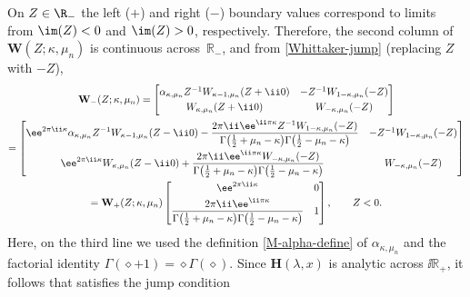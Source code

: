 On $Z\in\R_-$ the left ($+$) and right ($-$) boundary values correspond to limits from ${\im(Z)<0}$ and $\im(Z)>0$, respectively. Therefore, the second column of $\mathbf{W}(Z;\kappa,\mu_n)$ is continuous across~$\mathbb{R}_-$, and from \eqref{Whittaker-jump} (replacing $Z$ with $-Z$),
\begin{gather*}%
 \mathbf{W}_{-}(Z;\kappa,\mu_n)
 =
 \begin{bmatrix}
 \alpha_{\kappa,\mu_n}Z^{-1}W_{\kappa-1,\mu_n}(Z+\ii 0) & -Z^{-1}W_{1-\kappa,\mu_n}(-Z)\vspace{1mm}\\
 W_{\kappa,\mu_n}(Z+\ii 0) & W_{-\kappa,\mu_n}(-Z)
 \end{bmatrix}\\
 =\begin{bmatrix}
 \displaystyle \ee^{2\pi \ii\kappa}\alpha_{\kappa,\mu_n}Z^{-1}W_{\kappa-1,\mu_n}(Z-\ii 0) - \frac{2\pi \ii\ee^{\ii\pi \kappa}Z^{-1}W_{1-\kappa,\mu_n}(-Z)}{\Gamma\big(\frac{1}{2}+\mu_n-\kappa\big)\Gamma\big(\frac{1}{2}-\mu_n-\kappa\big)}& -Z^{-1}W_{1-\kappa,\mu_n}(-Z)\vspace{1mm}\\
 \displaystyle \ee^{2\pi \ii\kappa}W_{\kappa,\mu_n}(Z-\ii 0)+\frac{2\pi \ii\ee^{\ii\pi\kappa}W_{-\kappa,\mu_n}(-Z)}{\Gamma\big(\frac{1}{2}+\mu_n-\kappa\big)\Gamma\big(\frac{1}{2}-\mu_n-\kappa\big)} & W_{-\kappa,\mu_n}(-Z)
 \end{bmatrix}\\
 =\mathbf{W}_{+}(Z;\kappa,\mu_n)\begin{bmatrix}
 \ee^{2\pi \ii\kappa} & 0\vspace{1mm}\\
 \displaystyle \frac{2\pi \ii\ee^{\ii\pi\kappa}}{\Gamma\big(\frac{1}{2}+\mu_n-\kappa\big)\Gamma\big(\frac{1}{2}-\mu_n-\kappa\big)} & 1
 \end{bmatrix},\qquad Z<0.
\end{gather*}
Here, on the {third} line we used the definition \eqref{M-alpha-define} of $\alpha_{\kappa,\mu_n}$ and the factorial identity $\Gamma(\diamond+1)=\diamond\Gamma(\diamond)$. Since $\mathbf{H}(\lambda,x)$ is analytic across $\ii\mathbb{R}_+$, it follows that  satisfies the jump condition
